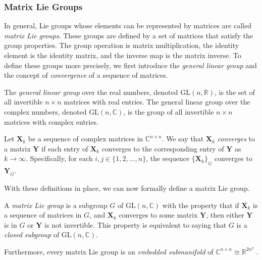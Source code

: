 \subsubsection{Matrix Lie Groups}
In general, Lie groups whose elements can be represented by matrices are called \emph{matrix Lie groups}. These groups are defined by a set of matrices that satisfy the group properties. The group operation is matrix multiplication, the identity element is the identity matrix, and the inverse map is the matrix inverse. To define these groups more precisely, we first introduce the \emph{general linear group} and the concept of \emph{convergence} of a sequence of matrices.
\begin{definition}
    The \emph{general linear group} over the real numbers, denoted $\text{GL}(n, \mathbb{R})$, is the set of all invertible $n\times n$ matrices with real entries. The general linear group over the complex numbers, denoted $\text{GL}(n, \mathbb{C})$, is the group of all invertible $n\times n$ matrices with complex entries.
\end{definition}
\begin{definition}
    Let $\mathbf{X}_k$ be a sequence of complex matrices in $\mathbb{C}^{n\times n}$. We say that $\mathbf{X}_k$ \emph{converges} to a matrix $\mathbf{Y}$ if each entry of $\mathbf{X}_k$ converges to the corresponding entry of $\mathbf{Y}$ as $k\to\infty$. Specifically, for each $i,j\in\{1,2,\dots,n\}$, the sequence $\{\mathbf{X}_k\}_{ij}$ converges to $\mathbf{Y}_{ij}$.
\end{definition}
With these definitions in place, we can now formally define a matrix Lie group.
\begin{definition}
    A \emph{matrix Lie group} is a subgroup $G$ of $\text{GL}(n, \mathbb{C})$ with the property that if $\mathbf{X}_k$ is a sequence of matrices in $G$, and $\mathbf{X}_k$ converges to some matrix $\mathbf{Y}$, then either $\mathbf{Y}$ is in $G$ or $\mathbf{Y}$ is not invertible. This property is equivalent to saying that $G$ is a \emph{closed subgroup} of $\text{GL}(n, \mathbb{C})$.
\end{definition}
Furthermore, every matrix Lie group is an \emph{embedded submanifold} of $\mathbb{C}^{n\times n}\cong\mathbb{R}^{2n^2}$ \citep[p. 70]{Hall2015}.

